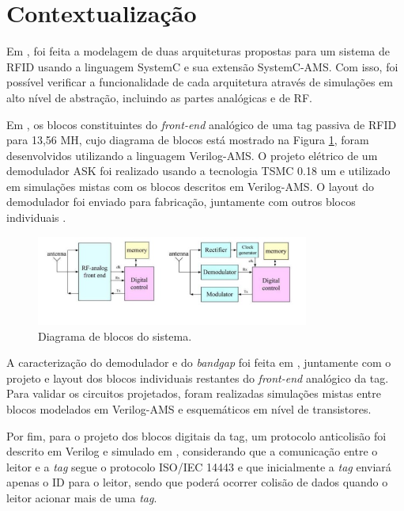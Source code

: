 \section{Contextualização}

Em \cite{Roberta}, foi feita a modelagem de duas arquiteturas propostas para um sistema de RFID usando a linguagem SystemC e sua extensão SystemC-AMS. Com isso, foi possível verificar a funcionalidade de cada arquitetura através de simulações em alto nível de abstração, incluindo as partes analógicas e de RF.

Em \cite{Marlon}, os blocos constituintes do \textit{front-end} analógico de uma tag passiva de RFID para 13,56 MH, cujo diagrama de blocos está mostrado na Figura \ref{11}, foram desenvolvidos utilizando a linguagem Verilog-AMS. O projeto elétrico de um demodulador ASK foi realizado usando a tecnologia TSMC 0.18 um e utilizado em simulações mistas com os blocos descritos em Verilog-AMS. O layout do demodulador foi enviado para fabricação, juntamente com outros blocos individuais \cite{waamaral}.

\begin{figure}[h!]
  \centering
  \includegraphics[width=0.8\textwidth]{blocos.jpg}
  \caption{Diagrama de blocos do sistema.\cite{li2009}}
  \label{11}
\end{figure}

A caracterização do demodulador e do \textit{bandgap} foi feita em \cite{jose}, juntamente com o projeto e layout dos blocos individuais restantes do \textit{front-end} analógico da tag. Para validar os circuitos projetados, foram realizadas simulações mistas entre blocos modelados em Verilog-AMS e esquemáticos em nível de transistores.

Por fim, para o projeto dos blocos digitais da tag, um protocolo anticolisão foi descrito em Verilog e simulado em \cite{henriq}, considerando que a comunicação entre o leitor e a \textit{tag} segue o protocolo ISO/IEC 14443 e que inicialmente a \textit{tag} enviará apenas o ID para o leitor, sendo que poderá ocorrer colisão de dados quando o leitor acionar mais de uma \textit{tag}.

\newpage
